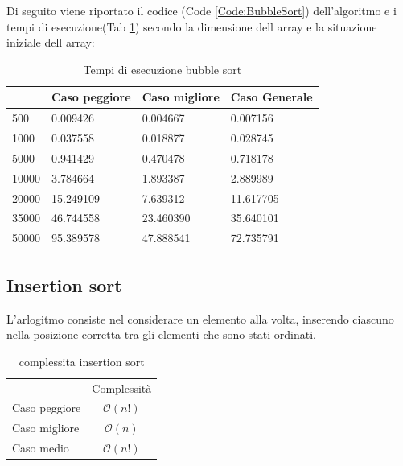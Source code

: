 \documentclass[12pt,a4paper]{report}
\begin{document}
Di seguito viene riportato il codice (Code \ref{Code:BubbleSort}) dell'algoritmo e i tempi di esecuzione(Tab \ref{Tab:Tempi esecuzione Bubblesort}) secondo la dimensione dell array e la situazione iniziale dell array:
	

\begin{table}[h]
\centering
\begin{tabular}{| l | l | l | l |}
\hline
      & Caso peggiore & Caso migliore & Caso Generale \\ \hline
500   & 0.009426      & 0.004667      & 0.007156      \\ \hline
1000  & 0.037558      & 0.018877      & 0.028745      \\ \hline
5000  & 0.941429      & 0.470478      & 0.718178      \\ \hline
10000 & 3.784664      & 1.893387      & 2.889989      \\ \hline
20000 & 15.249109     & 7.639312      & 11.617705     \\ \hline
35000 & 46.744558     & 23.460390     & 35.640101     \\ \hline
50000 & 95.389578     & 47.888541     & 72.735791    \\ \hline
\end{tabular}
\caption{Tempi di esecuzione bubble sort}
\label{Tab:Tempi esecuzione Bubblesort}
\end{table}

\newpage
\subsection{Insertion sort}
L'arlogitmo consiste nel considerare un elemento alla volta, inserendo ciascuno nella posizione corretta tra gli elementi che sono stati ordinati. 
\begin{table}[h]
	\centering
	\begin{tabular}{lc}
              & Complessità \\
Caso peggiore &       $ \mathcal{O}(n!)$      \\
Caso migliore &           $ \mathcal{O}(n)$   \\
Caso medio &  $ \mathcal{O}(n!)$\\
\end{tabular}
	\caption{complessita insertion sort}
	\label{Tab:CompInsertionSort}
\end{table}
\end{document}
